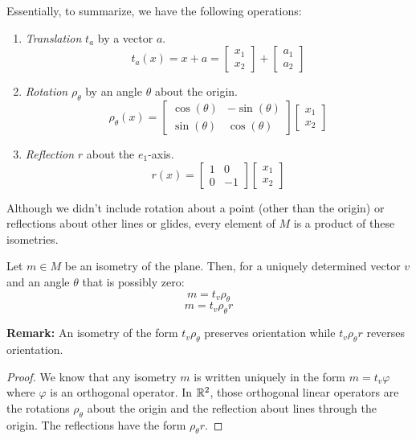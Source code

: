 \documentclass[letterpaper]{article}
\begin{document}
\bigskip 

Essentially, to summarize, we have the following operations:
\begin{enumerate}
    \item \emph{Translation} $t_a$ by a vector $a$. 
    \[t_{a}(x) = x + a = \begin{bmatrix}
        x_1 \\ x_2
    \end{bmatrix} + \begin{bmatrix}
        a_1 \\ a_2
    \end{bmatrix}\]
    \item \emph{Rotation} $\rho_{\theta}$ by an angle $\theta$ about the origin. 
    \[\rho_{\theta}(x) = \begin{bmatrix}
        \cos(\theta) & -\sin(\theta) \\ 
        \sin(\theta) & \cos(\theta)
    \end{bmatrix} \begin{bmatrix}
        x_1 \\ x_2
    \end{bmatrix}\] 
    \item \emph{Reflection} $r$ about the $e_1$-axis.
    \[r(x) = \begin{bmatrix}
        1 & 0 \\ 0 & -1
    \end{bmatrix} \begin{bmatrix}
        x_1 \\ x_2 
    \end{bmatrix}\]
\end{enumerate}
Although we didn't include rotation about a point (other than the origin) or reflections about other lines or glides, every element of $M$ is a product of these isometries. 

\begin{theorem}{}{}
    Let $m \in M$ be an isometry of the plane. Then, for a uniquely determined vector $v$ and an angle $\theta$ that is possibly zero: 
    \[m = t_v \rho_{\theta}\]
    \[m = t_v \rho_{\theta} r\] 
\end{theorem}
\textbf{Remark:} An isometry of the form $t_v \rho_{\theta}$ preserves orientation while $t_v \rho_{\theta} r$ reverses orientation. 

\begin{mdframed}
    \begin{proof}
        We know that any isometry $m$ is written uniquely in the form $m = t_v \varphi$ where $\varphi$ is an orthogonal operator. In $\mathbb{R}^2$, those orthogonal linear operators are the rotations $\rho_{\theta}$ about the origin and the reflection about lines through the origin. The reflections have the form $\rho_{\theta} r$. 
    \end{proof}
\end{mdframed}
\end{document}
